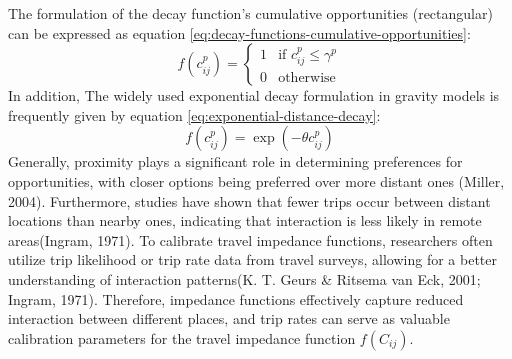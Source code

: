 \documentclass[12pt,twoside]{reedthesis}
\begin{document}
The formulation of the decay function's cumulative opportunities (rectangular) can be expressed as equation \eqref{eq:decay-functions-cumulative-opportunities}:
\begin{equation}
f(c^p_{ij}) = 
\begin{cases}
  1 & \text{if } c^p_{ij} \le \gamma^p \\
  0 & \text{otherwise}
\end{cases}
\label{eq:decay-functions-cumulative-opportunities}
\end{equation}
In addition, The widely used exponential decay formulation in gravity models is frequently given by equation \eqref{eq:exponential-distance-decay}:
\begin{equation}
f(c^p_{ij}) = \exp(-\theta c^p_{ij})
\label{eq:exponential-distance-decay}
\end{equation}
Generally, proximity plays a significant role in determining preferences for opportunities, with closer options being preferred over more distant ones (Miller, 2004). Furthermore, studies have shown that fewer trips occur between distant locations than nearby ones, indicating that interaction is less likely in remote areas(Ingram, 1971). To calibrate travel impedance functions, researchers often utilize trip likelihood or trip rate data from travel surveys, allowing for a better understanding of interaction patterns(K. T. Geurs \& Ritsema van Eck, 2001; Ingram, 1971). Therefore, impedance functions effectively capture reduced interaction between different places, and trip rates can serve as valuable calibration parameters for the travel impedance function \(f(C_{ij})\).
\end{document}

